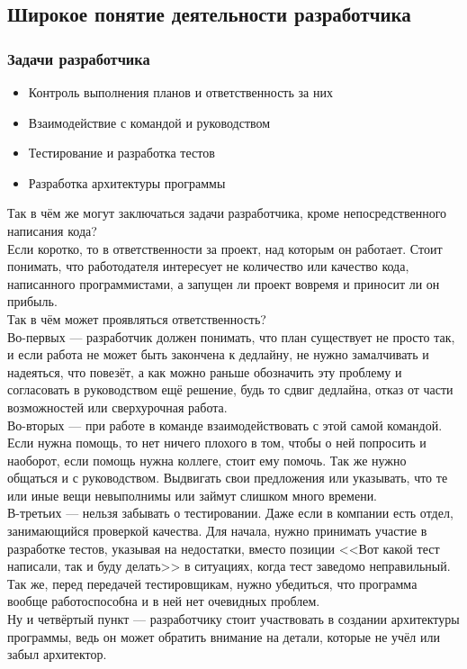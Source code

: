 \documentclass{../industrial-development}
\begin{document}
\subsection{Широкое понятие деятельности разработчика}
\begin{frame} \frametitle{Задачи разработчика}
  \begin{itemize}
  \item Контроль выполнения планов и ответственность за них
	\item Взаимодействие с командой и руководством
	\item Тестирование и разработка тестов
	\item Разработка архитектуры программы
  \end{itemize}
\end{frame}
\lecturenotes
Так в чём же могут заключаться задачи разработчика, кроме непосредственного написания кода?\\
Если коротко, то в ответственности за проект, над которым он работает. Стоит понимать, что работодателя интересует не количество или качество кода, написанного программистами, а запущен ли проект вовремя и приносит ли он прибыль.\\
Так в чём может проявляться ответственность?\\
Во-первых --- разработчик должен понимать, что план существует не просто так, и если работа не может быть закончена к дедлайну, не нужно замалчивать и надеяться, что повезёт, а как можно раньше обозначить эту проблему и согласовать в руководством ещё решение, будь то сдвиг дедлайна, отказ от части возможностей или сверхурочная работа.\\
Во-вторых --- при работе в команде взаимодействовать с этой самой командой. Если нужна помощь, то нет ничего плохого в том, чтобы о ней попросить и наоборот, если помощь нужна коллеге, стоит ему помочь. Так же нужно общаться и с руководством. Выдвигать свои предложения или указывать, что те или иные вещи невыполнимы или займут слишком много времени.\\
В-третьих --- нельзя забывать о тестировании. Даже если в компании есть отдел, занимающийся проверкой качества. Для начала, нужно принимать участие в разработке тестов, указывая на недостатки, вместо позиции <<Вот какой тест написали, так и буду делать>> в ситуациях, когда тест заведомо неправильный. Так же, перед передачей тестировщикам, нужно убедиться, что программа вообще работоспособна и в ней нет очевидных проблем.\\
Ну и четвёртый пункт --- разработчику стоит участвовать в создании архитектуры программы, ведь он может обратить внимание на детали, которые не учёл или забыл архитектор.
\end{document}
